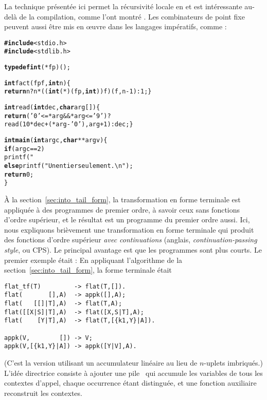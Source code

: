 La technique présentée ici permet la récursivité locale en \Erlang et
est intéressante au-delà de la compilation, comme l'ont montré
\cite{GoldbergWiener_2009}. Les combinateurs de point fixe peuvent
aussi être mis en {\oe}uvre dans les langages impératifs, comme
\Clang:
\begin{alltt}
\textbf{#include}<stdio.h>
\textbf{#include}<stdlib.h>

\textbf{typedef int} (*fp)();

\textbf{int} fact(fp f, \textbf{int} n) \{
  \textbf{return} n? n * ((\textbf{int} (*)(fp,\textbf{int}))f)(f,n-1) : 1; \}

\textbf{int} read(\textbf{int} dec, \textbf{char} arg[]) \{
  \textbf{return} ('0' <= *arg && *arg <= '9')?
         read(10*dec+(*arg - '0'),arg+1) : dec; \}

\textbf{int main}(\textbf{int} argc, \textbf{char}** argv) \{
  \textbf{if} (argc == 2)
     printf("%u\textbackslash{n}",fact(&fact,read(0,argv[1])));
  \textbf{else} printf("Un entier seulement.\textbackslash{n}");
  \textbf{return} 0;
\}
\end{alltt}


À la section~\ref{sec:into_tail_form}, la transformation en forme
terminale est appliquée à des programmes de premier ordre, à savoir
ceux sans fonctions d'ordre supérieur, et le résultat est un programme
du premier ordre aussi. Ici, nous expliquons brièvement une
transformation en forme terminale qui produit des fonctions d'ordre
supérieur \emph{avec continuations} (anglais,
\emph{continuation-passing style}, ou CPS). Le principal avantage est
que les programmes sont plus courts. Le premier exemple était
:  En appliquant l'algorithme
de la section~\ref{sec:into_tail_form}, la forme terminale était
\begin{verbatim}
flat_tf(T)         -> flat(T,[]).
flat(       [],A)  -> appk([],A);
flat(   [[]|T],A)  -> flat(T,A);
flat([[X|S]|T],A)  -> flat([X,S|T],A);
flat(    [Y|T],A)  -> flat(T,[{k1,Y}|A]).

appk(V,        []) -> V;
appk(V,[{k1,Y}|A]) -> appk([Y|V],A).
\end{verbatim}
(C'est la version utilisant un accumulateur linéaire au lieu de
\(n\)-uplets imbriqués.) L'idée directrice consiste à ajouter une
pile~ qui accumule les variables de tous les contextes
d'appel, chaque occurrence étant distinguée, et une fonction
auxiliaire  reconstruit les contextes.

